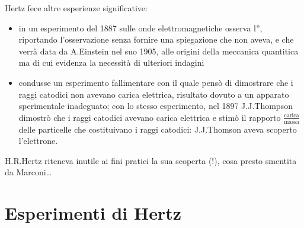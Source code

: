 \documentclass[letterpaper,10pt,italian]{jupyterBook}
\begin{document}
\sphinxAtStartPar
{}  

\sphinxAtStartPar
{} 

\sphinxAtStartPar
Hertz fece altre esperienze significative:
\begin{itemize}
\item {} 
\sphinxAtStartPar
in un esperimento del 1887 sulle onde elettromagnetiche osserva l”, riportando l’osservazione senza fornire una spiegazione \sphinxhyphen{} che non aveva, e che verrà data da A.Einstein nel suo  1905, alle origini della meccanica quantitica \sphinxhyphen{} ma di cui evidenza la necessità di ulteriori indagini

\item {} 
\sphinxAtStartPar
condusse un esperimento fallimentare con il quale pensò di dimostrare che i raggi catodici non avevano carica elettrica, risultato dovuto a un apparato sperimentale inadeguato; con lo stesso esperimento, nel 1897 J.J.Thompson dimostrò che i raggi catodici avevano carica elettrica e stimò il rapporto \(\frac{\text{carica}}{\text{massa}}\) delle particelle che costituivano i raggi catodici: J.J.Thomson aveva scoperto l’elettrone.

\end{itemize}

\sphinxAtStartPar
{}  H.R.Hertz riteneva inutile ai fini pratici la sua scoperta (!), cosa presto smentita da Marconi…

\sphinxAtStartPar
{}  


\section{Esperimenti di Hertz}
\label{\detokenize{ch/electromagnetism/em-waves:esperimenti-di-hertz}}\label{\detokenize{ch/electromagnetism/em-waves:physics-hs-electromagnetism-em-waves-hertz}}
\end{document}

